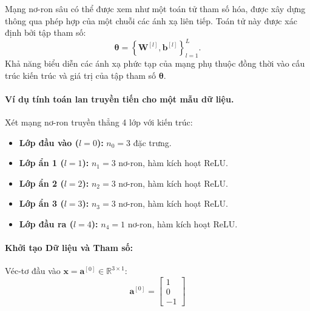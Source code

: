 \begin{remark}
Mạng nơ-ron sâu có thể được xem như một toán tử tham số hóa, được xây dựng thông qua phép hợp của một chuỗi các ánh xạ liên tiếp. Toán tử này được xác định bởi tập tham số:
\[\boldsymbol{\theta} 
= \left\{\mathbf{W}^{[l]},
\mathbf{b}^{[l]} \right\}_{l=1}^{L}.\]
Khả năng biểu diễn các ánh xạ phức tạp của mạng phụ thuộc đồng thời vào cấu trúc kiến trúc và giá trị của tập tham số $\boldsymbol{\theta}$.
\end{remark}

\paragraph{Ví dụ tính toán lan truyền tiến cho một mẫu dữ liệu.}
Xét mạng nơ-ron truyền thẳng 4 lớp với kiến trúc:
\begin{itemize}
    \item \textbf{Lớp đầu vào ($l=0$):} $n_0 = 3$ đặc trưng.
    \item \textbf{Lớp ẩn 1 ($l=1$):} $n_1 = 3$ nơ-ron, hàm kích hoạt ReLU.
    \item \textbf{Lớp ẩn 2 ($l=2$):} $n_2 = 3$ nơ-ron, hàm kích hoạt ReLU.
    \item \textbf{Lớp ẩn 3 ($l=3$):} $n_3 = 3$ nơ-ron, hàm kích hoạt ReLU.
    \item \textbf{Lớp đầu ra ($l=4$):} $n_4 = 1$ nơ-ron, hàm kích hoạt ReLU.
\end{itemize}
\paragraph{Khởi tạo Dữ liệu và Tham số:}
Véc-tơ đầu vào $\mathbf{x} = \mathbf{a}^{[0]} \in \mathbb{R}^{3 \times 1}$:
\begin{equation}
\mathbf{a}^{[0]} = 
\begin{bmatrix}
    1 \\ 0 \\ -1
\end{bmatrix}
\end{equation}

